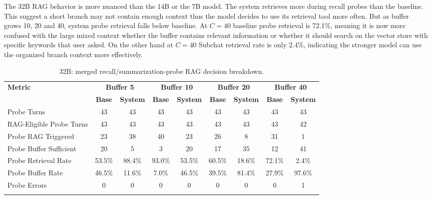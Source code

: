 \documentclass[pdflatex,sn-mathphys-num]{sn-jnl}%
\theoremstyle{thmstyleone}%
\theoremstyle{thmstyletwo}%
\theoremstyle{thmstylethree}%
\begin{document}




The 32B RAG behavior is more nuanced than the 14B or the 7B model. The system retrieves more during recall probes than the baseline. This suggest a short branch may not contain enough context thus the model decides to use its retrieval tool more often. But as buffer grows 10, 20 and 40, system probe retrieval falls below baseline. At $C=40$ baseline probe retrieval is 72.1\%, meaning it is now more confused with the large mixed context whether the buffer contains relevant information or whether it should search on the vector store with specific keywords that user asked. On the other hand at $C=40$ Subchat retrieval rate is only 2.4\%, indicating the stronger model can use the organized branch context more effectively. 
 




\begin{table}[htbp]
\caption{32B: merged recall/summarization-probe RAG decision breakdown.}\label{tab:32b_rag_main}
\centering
\tiny
\setlength{\tabcolsep}{2.2pt}
\begin{adjustbox}{width=\textwidth}
\begin{tabular}{lcccccccc}
\toprule
\textbf{Metric} & \multicolumn{2}{c}{\textbf{Buffer 5}} & \multicolumn{2}{c}{\textbf{Buffer 10}} & \multicolumn{2}{c}{\textbf{Buffer 20}} & \multicolumn{2}{c}{\textbf{Buffer 40}} \\
\cmidrule(lr){2-3}\cmidrule(lr){4-5}\cmidrule(lr){6-7}\cmidrule(lr){8-9}
 & \textbf{Base} & \textbf{System} & \textbf{Base} & \textbf{System} & \textbf{Base} & \textbf{System} & \textbf{Base} & \textbf{System} \\
\midrule
Probe Turns & 43 & 43 & 43 & 43 & 43 & 43 & 43 & 43 \\
RAG-Eligible Probe Turns & 43 & 43 & 43 & 43 & 43 & 43 & 43 & 42 \\
Probe RAG Triggered & 23 & 38 & 40 & 23 & 26 & 8 & 31 & 1 \\
Probe Buffer Sufficient & 20 & 5 & 3 & 20 & 17 & 35 & 12 & 41 \\
Probe Retrieval Rate & 53.5\% & 88.4\% & 93.0\% & 53.5\% & 60.5\% & 18.6\% & 72.1\% & 2.4\% \\
Probe Buffer Rate & 46.5\% & 11.6\% & 7.0\% & 46.5\% & 39.5\% & 81.4\% & 27.9\% & 97.6\% \\
Probe Errors & 0 & 0 & 0 & 0 & 0 & 0 & 0 & 1 \\
\botrule
\end{tabular}
\end{adjustbox}
\end{table}
\end{document}
